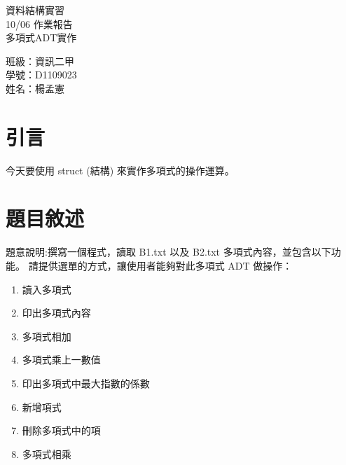 \documentclass[12pt, a4paper]{article}
\begin{document}
  \begin{center}
    {\Huge 資料結構實習} \\[2.5cm]
    {\Huge 10/06 作業報告} \\[1.5cm]
    {\Huge 多項式ADT實作} \\ [4.5cm]
    \hspace{.6in}
    \begin{minipage}[t]{.4\linewidth}
      {\Large 班級：資訊二甲}\\[0.5cm]
      {\Large 學號：D1109023}\\[0.5cm]
      {\Large 姓名：楊孟憲}
    \end{minipage}    
  \end{center}

  \newpage

  \begin{samepage}
    \fontsize{18pt}{20pt} \selectfont  
    \tableofcontents
    \normalfont
  \end{samepage}
  
  \newpage


  \section{\fontsize{20pt}{22pt}\selectfont 引言}
  \begin{samepage}
    \fontsize{16pt}{18pt} \selectfont
    今天要使用 struct (結構) 來實作多項式的操作運算。
    
  \end{samepage}


  \section{\fontsize{20pt}{22pt}\selectfont 題目敘述}
  \begin{samepage}
    \fontsize{16pt}{18pt} \selectfont
        題意說明:撰寫一個程式，讀取 B1.txt 以及 B2.txt 多項式內容，並包含以下功能。
        請提供選單的方式，讓使用者能夠對此多項式 ADT 做操作：
        \begin{enumerate}
            \fontsize{14pt}{16pt} \selectfont
            \item 讀入多項式
            \item 印出多項式內容
            \item 多項式相加
            \item 多項式乘上一數值
            \item 印出多項式中最大指數的係數
            \item 新增項式
            \item 刪除多項式中的項
            \item 多項式相乘
        \end{enumerate}
  \end{samepage}
\end{document}
